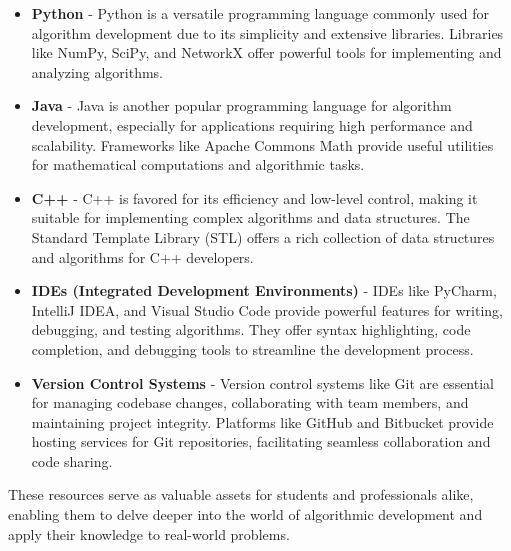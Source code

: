 \documentclass[12pt]{book} %
\begin{document}
\begin{itemize}
    \item \textbf{Python} - Python is a versatile programming language commonly used for algorithm development due to its simplicity and extensive libraries. Libraries like NumPy, SciPy, and NetworkX offer powerful tools for implementing and analyzing algorithms.
    
    \item \textbf{Java} - Java is another popular programming language for algorithm development, especially for applications requiring high performance and scalability. Frameworks like Apache Commons Math provide useful utilities for mathematical computations and algorithmic tasks.
    
    \item \textbf{C++} - C++ is favored for its efficiency and low-level control, making it suitable for implementing complex algorithms and data structures. The Standard Template Library (STL) offers a rich collection of data structures and algorithms for C++ developers.
    
    \item \textbf{IDEs (Integrated Development Environments)} - IDEs like PyCharm, IntelliJ IDEA, and Visual Studio Code provide powerful features for writing, debugging, and testing algorithms. They offer syntax highlighting, code completion, and debugging tools to streamline the development process.
    
    \item \textbf{Version Control Systems} - Version control systems like Git are essential for managing codebase changes, collaborating with team members, and maintaining project integrity. Platforms like GitHub and Bitbucket provide hosting services for Git repositories, facilitating seamless collaboration and code sharing.
\end{itemize}

These resources serve as valuable assets for students and professionals alike, enabling them to delve deeper into the world of algorithmic development and apply their knowledge to real-world problems.

\FloatBarrier
\end{document}
